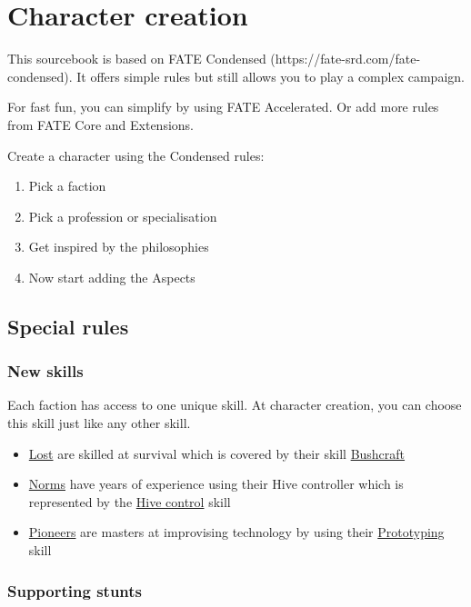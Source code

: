 \chapter{Character creation}

This sourcebook is based on FATE Condensed (https://fate-srd.com/fate-condensed). It offers simple rules but still allows you to play a complex campaign.

For fast fun, you can simplify by using FATE Accelerated.
Or add more rules from FATE Core and Extensions.

Create a character using the Condensed rules:

\begin{enumerate}
    \item Pick a faction
    \item Pick a profession or specialisation
    \item Get inspired by the philosophies
    \item Now start adding the Aspects
\end{enumerate}

\section{Special rules}

\subsection{New skills}

Each faction has access to one unique skill. At character creation, you can choose this skill just like any other skill.
\begin{itemize}
    \item \hyperref[sec: Lost]{Lost} are skilled at survival which is covered by their skill \hyperref[sec: Bushcraft skill]{Bushcraft}
    \item \hyperref[sec: Norms]{Norms} have years of experience using their Hive controller which is represented by the \hyperref[sec:Hive control skill]{Hive control} skill
    \item \hyperref[sec: Pioneers]{Pioneers} are masters at improvising technology by using their \hyperref[sec:Prototyping skill]{Prototyping} skill
\end{itemize}

\subsection{Supporting stunts}

